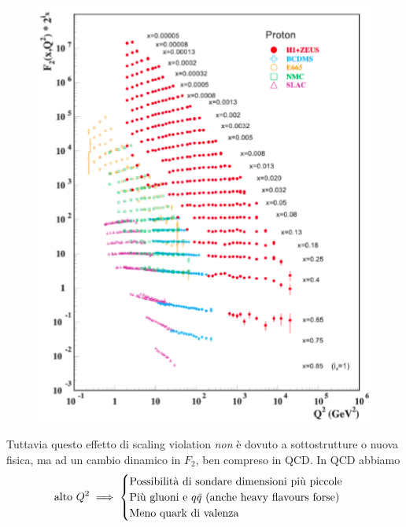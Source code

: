 \begin{minipage}[t]{0.48\textwidth}
\begin{figure}[H]
    \centering
    \includegraphics[width=\textwidth]{immagini/fig_scaling_viol.png}
\end{figure}
\end{minipage}
Tuttavia questo effetto di scaling violation \textit{non} è dovuto a sottostrutture o nuova fisica, ma ad un cambio dinamico in $F_2$, ben compreso in QCD. In QCD abbiamo 
\begin{equation*}
    \textnormal{alto }Q^2\implies
    \begin{cases}
        \textnormal{Possibilità di sondare dimensioni più piccole}\\
        \textnormal{Più gluoni e }q\bar q\textnormal{ (anche heavy flavours forse)}\\
        \textnormal{Meno quark di valenza}
    \end{cases}
\end{equation*}
